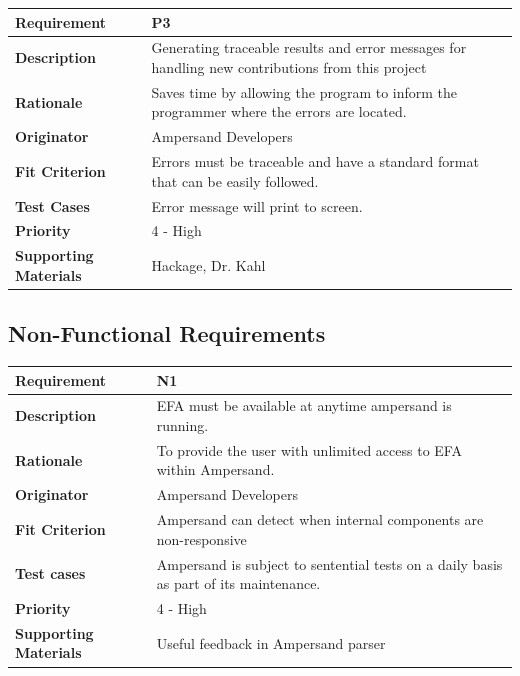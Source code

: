 \documentclass[12pt]{report}
\begin{document}
{\setlength{\tabcolsep}{12pt} %
    \begin{tabularx}{\textwidth}{>{\bfseries}C{3cm}X}
        Requirement & P3 \\ 
        \midrule
        \endhead
        Description  & Generating traceable results and error messages for 
        handling new contributions from this project
        \\	Rationale & Saves time by allowing the program to inform the 
        programmer where the errors are located.
        \\	Originator & Ampersand Developers
        \\	Fit Criterion & Errors must be traceable and have a standard format 
        that can be easily followed.
        \\ Test Cases & Error message will print to screen.
        \\	Priority & 4 - High
        \\	Supporting Materials & Hackage, Dr. Kahl
        \vspace{12pt}
    \end{tabularx}
}

\subsection{Non-Functional Requirements}
{\setlength{\tabcolsep}{12pt} %
\begin{tabularx}{\textwidth}{>{\bfseries}C{3cm}X}
Requirement & N1 \\ 
\midrule
\endhead
Description  & EFA must be available at anytime ampersand is running.
\\	Rationale & To provide the user with unlimited access to EFA within 
Ampersand.
\\	Originator & Ampersand Developers
\\	Fit Criterion & Ampersand can detect when internal components are 
non-responsive
\\ Test cases & Ampersand is subject to sentential tests on a daily basis as 
part of its maintenance.   
\\	Priority & 4 - High
\\	Supporting Materials & Useful feedback in Ampersand parser \cite{SB2011}
\vspace{12pt}
\end{tabularx}
}
\end{document}
